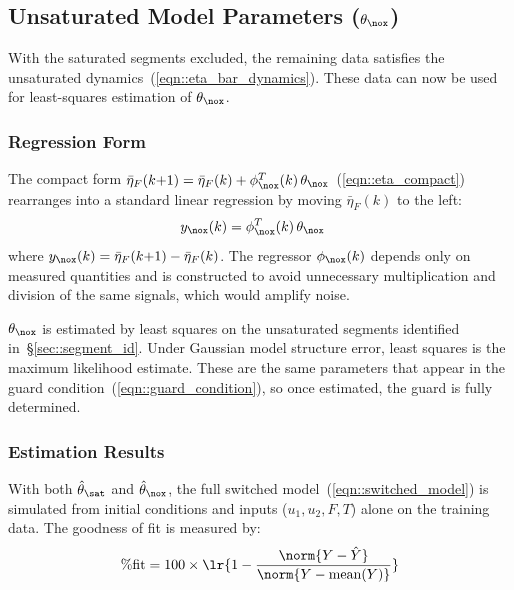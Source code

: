 \subsection{Unsaturated Model Parameters ($\theta_{\nox}$) \label{sec::unsat_est}}

With the saturated segments excluded, the remaining data satisfies the unsaturated
dynamics~(\ref{eqn::eta_bar_dynamics}). These data can now be used for least-squares estimation of $\theta_{\nox}$.

\subsubsection{Regression Form}

The compact form $\bar\eta_F(k{+}1) = \bar\eta_F(k) + \phi_{\nox}^T(k)\,\theta_{\nox}$~(\ref{eqn::eta_compact})
rearranges into a standard linear regression by moving $\bar\eta_F(k)$ to the left:
\begin{align}
    y_{\nox}(k) &= \phi_{\nox}^T(k)\,\theta_{\nox}
    \label{eqn::regression_form}
\end{align}
where $y_{\nox}(k) = \bar\eta_F(k{+}1) - \bar\eta_F(k)$. The regressor $\phi_{\nox}(k)$ depends only on measured
quantities and is constructed to avoid unnecessary multiplication and division of the same signals, which would amplify
noise.

$\theta_{\nox}$ is estimated by least squares on the unsaturated segments identified
in~\S\ref{sec::segment_id}. Under Gaussian model structure error, least squares is the maximum likelihood
estimate. These are the same parameters that appear in the guard
condition~(\ref{eqn::guard_condition}), so once estimated, the guard is fully determined.

\subsubsection{Estimation Results}

With both $\hat\theta_{\sat}$ and $\hat\theta_{\nox}$, the full switched model~(\ref{eqn::switched_model}) is simulated
from initial conditions and inputs ($u_1, u_2, F, T$) alone on the training data. The goodness of fit is measured by:
\begin{align}
    \%\text{fit} = 100 \times \lr{1 - \frac{\norm{Y - \hat Y}}{\norm{Y - \text{mean}(Y)}}}
\end{align}

